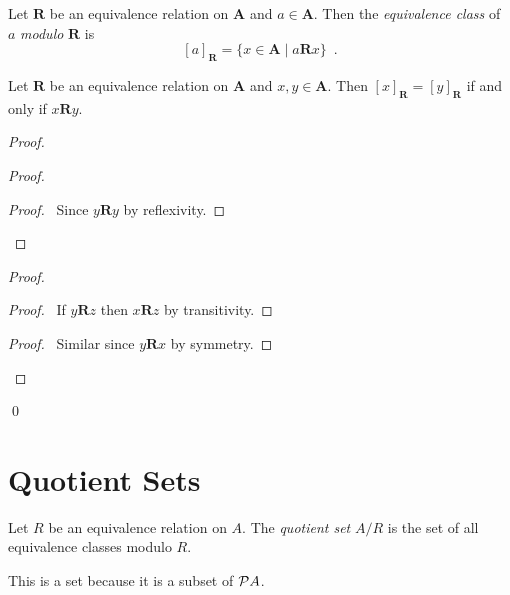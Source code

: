 \begin{definition}
    Let $\mathbf{R}$ be an equivalence relation on $\mathbf{A}$ and $a \in \mathbf{A}$.
    Then the
    \emph{equivalence class} of $a$ \emph{modulo} $\mathbf{R}$ is
    \[ [a]_\mathbf{R} = \{ x \in \mathbf{A} \mid a\mathbf{R}x \} \enspace . \]
\end{definition}

\begin{lemma}
    \label{lemma:equivalence_classes}
    Let $\mathbf{R}$ be an equivalence relation on $\mathbf{A}$ and $x,y \in \mathbf{A}$.
    Then $[x]_\mathbf{R} = [y]_\mathbf{R}$ if and only if $x\mathbf{R}y$.
\end{lemma}

\begin{proof}
    \pf
    \begin{proof}
        \begin{proof}
            \pf\ Since $y\mathbf{R}y$ by reflexivity.
        \end{proof}
    \end{proof}
    \begin{proof}
        \begin{proof}
            \pf\ If $y\mathbf{R}z$ then $x\mathbf{R}z$ by transitivity.
        \end{proof}
        \begin{proof}
            \pf\ Similar since $y\mathbf{R}x$ by symmetry.
        \end{proof}
    \end{proof}
    \qed
\end{proof}

\section{Quotient Sets}

\begin{definition}
    Let $R$ be an equivalence relation on $A$. The \emph{quotient set} $A / R$
    is the set of all equivalence classes modulo $R$.

    This is a set because it is a subset of $\mathcal{P} A$.
\end{definition}

